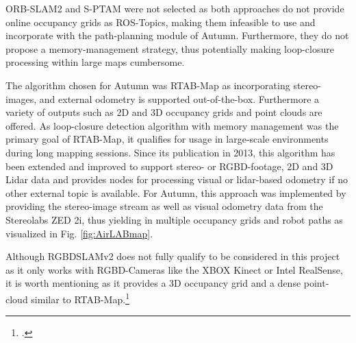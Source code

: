ORB-SLAM2 and S-PTAM were not selected as both approaches do not provide online occupancy grids as ROS-Topics, making them infeasible to use and incorporate with the path-planning module of Autumn. Furthermore, they do not propose a memory-management strategy, thus potentially making loop-closure processing within large maps cumbersome. 

The algorithm chosen for Autumn was RTAB-Map as incorporating stereo-images, and external odometry is supported out-of-the-box. Furthermore a variety of outputs such as 2D and 3D occupancy grids and point clouds are offered. 
As loop-closure detection algorithm with memory management was the primary goal of RTAB-Map, it qualifies for usage in large-scale environments during long mapping sessions.
Since its publication in 2013, this algorithm has been extended and improved to support stereo- or RGBD-footage, 2D and 3D Lidar data and provides nodes for processing visual or lidar-based odometry if no other external topic is available. 
For Autumn, this approach was implemented by providing the stereo-image stream as well as visual odometry data from the Stereolabs ZED 2i, thus yielding in multiple occupancy grids and robot paths as visualized in Fig. \ref{fig:AirLABmap}.

Although RGBDSLAMv2 does not fully qualify to be considered in this project as it only works with RGBD-Cameras like the XBOX Kinect or Intel RealSense, it is worth mentioning as it provides a 3D occupancy grid and a dense point-cloud similar to RTAB-Map.\footcite{labbe2019rtab}

